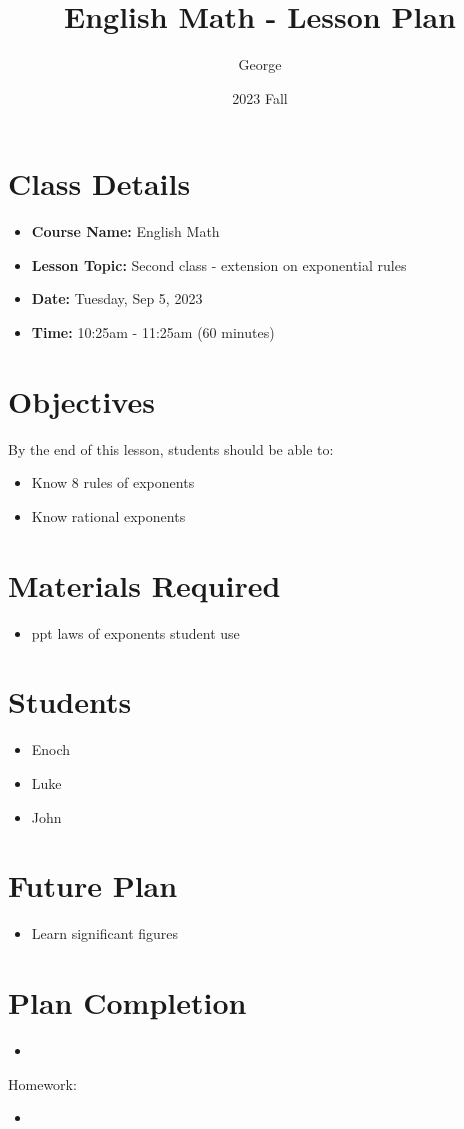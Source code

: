 \documentclass[12pt]{article}
\title{English Math - Lesson Plan}
\author{George}
\date{2023 Fall}
\begin{document}
\maketitle

\section{Class Details}
\begin{itemize}
    \item \textbf{Course Name:} English Math
    \item \textbf{Lesson Topic:}  Second class - extension on exponential rules
    \item \textbf{Date:} Tuesday, Sep 5, 2023
    \item \textbf{Time:} 10:25am - 11:25am (60 minutes)
\end{itemize}

\section{Objectives}
By the end of this lesson, students should be able to:
\begin{itemize}
    \item Know 8 rules of exponents
    \item Know rational exponents

\end{itemize}

\section{Materials Required}
\begin{itemize}
   
    \item ppt laws of exponents student use

  
\end{itemize}


\section{Students}
\begin{itemize}
    \item Enoch
    \item Luke
    \item John

\end{itemize}


\section{Future Plan}
\begin{itemize}
    \item Learn significant figures

\end{itemize}
\section{Plan Completion}
\begin{itemize}
    \item 
\end{itemize}
Homework: 
\begin{itemize}
    \item 
\end{itemize}
\end{document}
